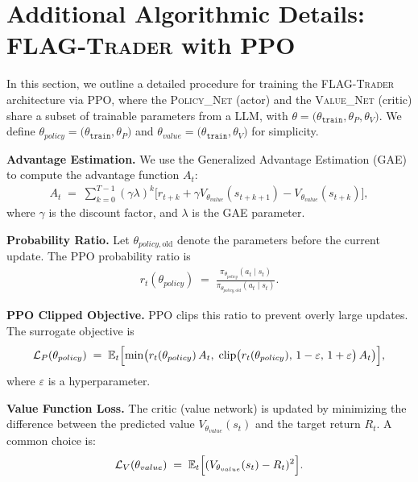 \section{Additional Algorithmic  Details: \textsc{FLAG-Trader} with PPO}\label{sec:Appendix_A}



In this section, we outline a detailed procedure for training the \textsc{FLAG-Trader} architecture via PPO, where the \textsc{Policy\_Net} (actor) and the \textsc{Value\_Net} (critic) share a subset of trainable parameters from a LLM, with
$\theta = \big( \theta_{\texttt{train}}, \theta_P, \theta_V\big)$.
We define $\theta_{policy} = \big( \theta_{\texttt{train}}, \theta_P)$ and $\theta_{value} = \big( \theta_{\texttt{train}}, \theta_V)$ for simplicity.

\textbf{Advantage Estimation.}
We use the Generalized Advantage Estimation (GAE) to compute the advantage function \( A_t \):
\begin{align}
    A_t \;=\; \sum_{k=0}^{T-1} (\gamma \lambda)^k \bigl[r_{t+k} + \gamma V_{\theta_{value}}(s_{t+k+1}) - V_{\theta_{value}}(s_{t+k})\bigr],
\end{align}
where \( \gamma \) is the discount factor, and \( \lambda \) is the GAE parameter.

\textbf{Probability Ratio.}
Let \(\theta_{policy, \mathrm{old}}\) denote the parameters before the current update. The PPO probability ratio is
\begin{align}
    r_t(\theta_{policy}) \;=\; \frac{\pi_{\theta_{policy}}(a_t \mid s_t)}{\pi_{\theta_{policy,\mathrm{old}}}(a_t \mid s_t)}.
\end{align}


\textbf{PPO Clipped Objective.}
PPO clips this ratio to prevent overly large updates. The surrogate objective is
\begin{align}
    \mathcal{L}_P(\theta_{policy}) \;=\; \mathbb{E}_t \Bigl[
  \min\bigl(r_t(\theta_{policy})\,A_t,\; \text{clip}\bigl(r_t(\theta_{policy}),\,1-\varepsilon,\,1+\varepsilon\bigr)\,A_t\bigr)
\Bigr],
\end{align}
where \(\varepsilon\) is a hyperparameter.

\textbf{Value Function Loss.}
The critic (value network) is updated by minimizing the difference between the predicted value \(V_{\theta_{value}}(s_t)\) and the target return \(R_t\). A common choice is:
\begin{align}
    \mathcal{L}_{V}(\theta_{value}) \;=\; \mathbb{E}_t\Bigl[(V_{\theta_{value}}(s_t) - R_t)^2\Bigr].
\end{align}



